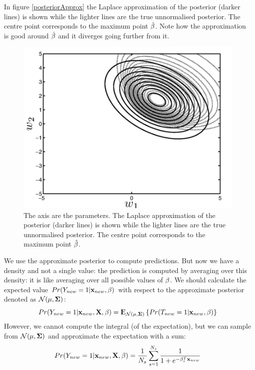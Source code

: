In figure \autoref{posteriorApprox} the Laplace approximation of the posterior (darker lines) is shown while the lighter lines are the true unnormalised posterior. The centre point corresponds to the maximum point $\hat{\mathbf{\beta}}$. Note how the approximation is good around $\hat{\mathbf{\beta}}$ and it diverges going further from it.
\begin{figure}
\centering
\includegraphics[scale=0.4]{img/posteriorApprox}
\caption{The axis are the parameters. The Laplace approximation of the posterior (darker lines) is shown while the lighter lines are the true unnormalised posterior. The centre point corresponds to the maximum point $\hat{\mathbf{\beta}}$.}
\label{posteriorApprox}
\end{figure}

We use the approximate posterior to compute predictions. But now we have a density and not a single value: the prediction is computed by averaging over this density: it is like averaging over all possible values of $\mathbf{\beta}$. We should calculate the expected value $Pr(Y_{new} = 1|\mathbf{x}_{new}, \mathbf{\beta})$ with respect to the approximate posterior denoted as $\CMcal{N}(\mathbf{\mu, \Sigma})$:
\begin{equation}
Pr(Y_{new}=1|\x_{new}, \X, \be) = \E_{\CMcal{N}(\mathbf{\mu, \Sigma})}\left\lbrace Pr(T_{new}=1| \x_{new}, \be)\right\rbrace
\end{equation}
However, we cannot compute the integral (of the expectation), but we can sample from $\CMcal{N}(\mathbf{\mu, \Sigma})$ and approximate the expectation with a sum:
\begin{equation}
\label{approxDen}
Pr(Y_{new}=1|\mathbf{x}_{new}, \mathrm{\mathbf{X}}, \mathbf{\beta}) = \frac{1}{N_s}\sum_{s=1}^{N_s}\frac{1}{1+e^{-\mathbf{\beta}_s^T \mathbf{x}_{new}}}
\end{equation}

